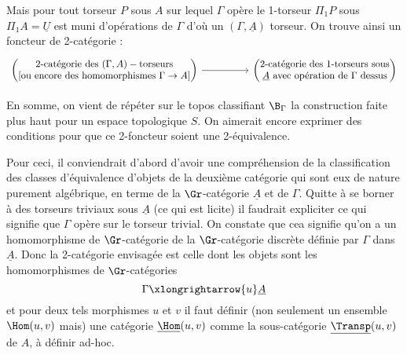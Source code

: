 Mais pour tout torseur $P$ sous $A$ sur lequel $\Gamma$ opère le 1-torseur $\Pi_1 P$ sous $\Pi_1 A = \underline{U}$ est muni d'opérations de $\Gamma$ d'où un $(\Gamma, \underline{A})$ torseur. On trouve ainsi un foncteur de 2-catégorie :
\[\begin{tikzcd}
	{\begin{pmatrix} \text{2-catégorie des}~(\Gamma, A)-\text{torseurs} \\ \text{[ou encore des homomorphismes}~\Gamma \to A] \end{pmatrix}} && {\begin{pmatrix} \text{2-catégorie des 1-torseurs sous} \\ \underline{A}~\text{avec opération de}~\Gamma~\text{dessus} \end{pmatrix}}
	\arrow[from=1-1, to=1-3]
\end{tikzcd}\]
 
 En somme, on vient de répéter sur le topos classifiant $\B_\Gamma$ la construction faite plus haut pour un espace topologique $S$. On aimerait encore exprimer des conditions pour que ce 2-foncteur soient une 2-équivalence.

Pour ceci, il conviendrait d'abord d'avoir une compréhension de la classification des classes d'équivalence d'objets de la deuxième catégorie qui sont eux de nature purement algébrique, en terme de la $\Gr$-catégorie $\underline{A}$ et de $\Gamma$. Quitte à se borner à des torseurs triviaux sous $\underline{A}$ (ce qui est licite) il faudrait expliciter ce qui signifie que $\Gamma$ opère sur le torseur trivial. On constate que cea signifie qu'on a un homomorphisme de $\Gr$-catégorie de la $\Gr$-catégorie discrète définie par $\Gamma$ dans $\underline{A}$. Donc la 2-catégorie envisagée est celle dont les objets sont les homomorphismes de $\Gr$-catégories 
$$
\Gamma \xlongrightarrow{u} \underline{A}
$$
et pour deux tels morphismes $u$ et $v$ il faut définir (non seulement un ensemble $\Hom(u, v)$ mais) une catégorie $\underline{\Hom}(u, v)$ comme la sous-catégorie $\underline{\Transp}(u, v)$ de $A$, à définir ad-hoc.


